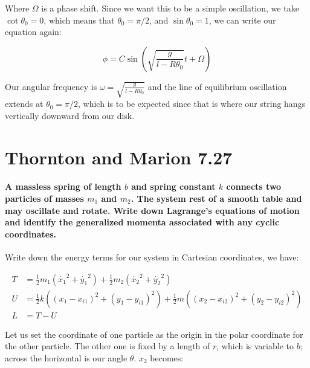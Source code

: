 \documentclass{article}
\numberwithin{equation}{section}
\begin{document}
Where $\Omega$ is a phase shift. Since we want this to be a simple oscillation, we take $\cot \theta_0 = 0$, which means that $\theta_0 = \pi/2$, and $\sin\theta_0 = 1$, we can write our equation again:

\begin{equation}
    \phi = C \sin (\sqrt{\frac{g}{l-R \theta_0}} t + \Omega)
\end{equation}

Our angular frequency is $\omega = \sqrt{\frac{g}{l-R \theta_0}}$ and the line of equilibrium oscillation extends at $\theta_0 = \pi /2$, which is to be expected since that is where our string hangs vertically downward from our disk. 

\section{Thornton and Marion 7.27} 

\paragraph{A massless spring of length $b$ and spring constant $k$ connects two particles of masses $m_1$ and $m_2$. The system rest of a smooth table and may oscillate and rotate. Write down Lagrange’s equations of motion and identify the generalized momenta associated with any cyclic coordinates. \\}


Write down the energy terms for our system in Cartesian coordinates, we have:

\begin{equation}
    \begin{split}
        T &= \frac{1}{2} m_1(\dot{x_1}^2 + \dot{y_1}^2) + \frac{1}{2} m_2(\dot{x_2}^2 + \dot{y_2}^2) \\
        U &= \frac{1}{2} k((x_1-x_{i1})^2 + (y_1-y_{i1})^2) + \frac{1}{2} m((x_2-x_{i2})^2 + (y_2-y_{i2})^2) \\
        L &= T - U
    \end{split}
\end{equation}

Let us set the coordinate of one particle as the origin in the polar coordinate for the other particle. The other one is fixed by a length of $r$, which is variable to $b$; across the horizontal is our angle $\theta$. $x_2$ becomes:
\end{document}
